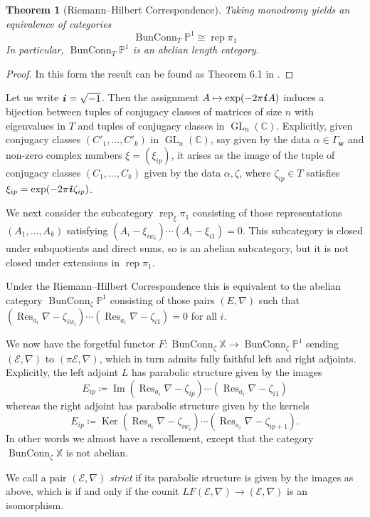 \documentclass[12pt,a4paper]{amsart}
\theoremstyle{plain}
\newtheorem{thm}{Theorem}[section]
\newcommand{\C}{\mathbb C}
\newcommand{\PP}{\mathbb P}
\DeclareMathOperator{\rep}{rep}
\DeclareMathOperator{\GL}{GL}
\DeclareMathOperator{\Ker}{Ker}
\DeclareMathOperator{\Ima}{Im}
\DeclareMathOperator{\Res}{Res}
\DeclareMathOperator{\BunConn}{BunConn}
\newcommand{\E}{\mathcal E}
\newcommand{\XX}{\mathbb X}
\newcommand{\bw}{\mathbf w}
\newcommand{\I}{\textit{\textbf i}\mkern2mu}%
\begin{document}
\begin{thm}[Riemann--Hilbert Correspondence]
Taking monodromy yields an equivalence of categories
\[ \BunConn_T\PP^1 \cong \rep\pi_1 \]
In particular, $\BunConn_T\PP^1$ is an abelian length category.
\end{thm}

\begin{proof}
In this form the result can be found as Theorem 6.1 in \cite{CBipb}.
\end{proof}

Let us write $\I=\sqrt{-1}$. Then the assignment $A\mapsto\exp(-2\pi\I A)$ induces a bijection between tuples of conjugacy classes of matrices of size $n$ with eigenvalues in $T$ and tuples of conjugacy classes in $\GL_n(\C)$. Explicitly, given conjugacy classes $(C'_1,\ldots,C'_k)$ in $\GL_n(\C)$, say given by the data $\alpha\in\Gamma_\bw$ and non-zero complex numbers $\xi=(\xi_{ip})$, it arises as the image of the tuple of conjugacy classes $(C_1,\ldots,C_k)$ given by the data $\alpha,\zeta$, where $\zeta_{ip}\in T$ satisfies $\xi_{ip}=\exp(-2\pi\I\zeta_{ip})$.

We next consider the subcategory $\rep_\xi\pi_1$ consisting of those representations $(A_1,\ldots,A_k)$ satisfying $(A_i-\xi_{iw_i})\cdots(A_i-\xi_{i1})=0$. This subcategory is closed under subquotients and direct sums, so is an abelian subcategory, but it is not closed under extensions in $\rep\pi_1$.

Under the Riemann--Hilbert Correspondence this is equivalent to the abelian category $\BunConn_\zeta\PP^1$ consisting of those pairs $(E,\nabla)$ such that $(\Res_{a_i}\nabla-\zeta_{iw_i})\cdots(\Res_{a_i}\nabla-\zeta_{i1})=0$ for all $i$.

We now have the forgetful functor $F\colon\BunConn_\zeta\XX\to\BunConn_\zeta\PP^1$ sending $(\E,\nabla)$ to $(\pi\E,\nabla)$, which in turn admits fully faithful left and right adjoints. Explicitly, the left adjoint $L$ has parabolic structure given by the images
\[ E_{ip} \coloneqq \Ima(\Res_{a_i}\nabla-\zeta_{ip})\cdots(\Res_{a_i}\nabla-\zeta_{i1}) \]
whereas the right adjoint has parabolic structure given by the kernels
\[ E_{ip} \coloneqq \Ker(\Res_{a_i}\nabla-\zeta_{iw_i})\cdots(\Res_{a_i}\nabla-\zeta_{ip+1}). \]
In other words we almost have a recollement, except that the category $\BunConn_\zeta\XX$ is not abelian.

We call a pair $(\E,\nabla)$ \emph{strict} if its parabolic structure is given by the images as above, which is if and only if the counit $LF(\E,\nabla)\to(\E,\nabla)$ is an isomorphism.
\end{document}
